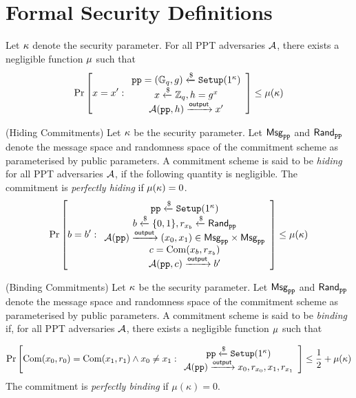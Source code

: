 \documentclass{article}
\begin{document}
\section{Formal Security Definitions}
\label{app:sec_defns}

\begin{definition} Let $\kappa$ denote the security parameter.
For all PPT adversaries $\mathcal{A}$, there exists a negligible function $\mu$ such that 
     \[ \Pr\left[ x = x^\prime : \begin{array}{c} \texttt{pp} = (\mathbb{G}_q, g) \xleftarrow{\$} \texttt{Setup}(1^\kappa) \\
     x \xleftarrow{\$} \mathbb{Z}_q, h = g^x \\
       \mathcal{A}(\texttt{pp}, h) \xrightarrow{\mathsf{output}} x^\prime \\
    \end{array} \right]
  \leq \mu(\kappa)  \] 

\label{defn:discrete_log}
\end{definition}

\begin{definition} (Hiding Commitments) Let $\kappa$ be the security parameter. Let $\mathsf{Msg}_{\texttt{pp}}$ and $\mathsf{Rand}_{\texttt{pp}}$ denote the message space and randomness space of the commitment scheme as parameterised by public parameters. A commitment scheme is said to be \textit{hiding} for all PPT adversaries $\mathcal{A}$, if the following quantity is negligible. The commitment is \textit{perfectly hiding} if $\mu(\kappa) = 0$.
\label{defn:hiding_com}
     \[ \Pr\left[ b = b^\prime : \begin{array}{c} \texttt{pp} \xleftarrow{\$} \texttt{Setup}(1^\kappa) \\
     b \xleftarrow{\$} \{ 0, 1\}, r_{x_b} \xleftarrow{\$} \mathsf{Rand}_{\texttt{pp}} \\
      \mathcal{A}(\texttt{pp}) \xrightarrow{\mathsf{output}} (x_0, x_1) \in \mathsf{Msg}_{\texttt{pp}}\times \mathsf{Msg}_{\texttt{pp}}  \\
     c = \operatorname{Com}(x_b, r_{x_b}) \\
      \mathcal{A}(\texttt{pp}, c) \xrightarrow{\mathsf{output}} b^\prime
    \end{array} \right]
  \leq \mu(\kappa)  \] 
\end{definition}

\begin{definition} (Binding Commitments) Let $\kappa$ be the security parameter. Let $\mathsf{Msg}_{\texttt{pp}}$ and $\mathsf{Rand}_{\texttt{pp}}$ denote the message space and randomness space of the commitment scheme as parameterised by public parameters. A commitment scheme is said to be \textit{binding} if, for all PPT adversaries $\mathcal{A}$, there exists a negligible function $\mu$ such that

\label{defn:binding_com}
     \[  \Pr\left[ \operatorname{Com}(x_0, r_0)= \operatorname{Com}(x_1, r_1) \land x_0 \neq x_1 : \begin{array}{c} \texttt{pp} \xleftarrow{\$} \texttt{Setup}(1^\kappa) \\
       \mathcal{A}(\texttt{pp}) \xrightarrow{\mathsf{output}} x_0, r_{x_0}, x_1, r_{x_1}  \\     
    \end{array} \right]
 \leq \frac{1}{2} + \mu(\kappa)  \] 
The commitment is \textit{perfectly binding} if $\mu(\kappa) = 0$.
\end{definition}
\end{document}
